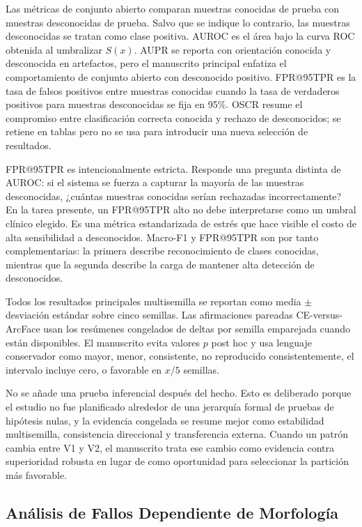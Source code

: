 \documentclass[11pt]{article}
\begin{document}
Las métricas de conjunto abierto comparan muestras conocidas de prueba con muestras desconocidas de prueba. Salvo que se indique lo contrario, las muestras desconocidas se tratan como clase positiva. AUROC es el área bajo la curva ROC obtenida al umbralizar $S(x)$. AUPR se reporta con orientación conocida y desconocida en artefactos, pero el manuscrito principal enfatiza el comportamiento de conjunto abierto con desconocido positivo. FPR@95TPR es la tasa de falsos positivos entre muestras conocidas cuando la tasa de verdaderos positivos para muestras desconocidas se fija en 95\%. OSCR resume el compromiso entre clasificación correcta conocida y rechazo de desconocidos; se retiene en tablas pero no se usa para introducir una nueva selección de resultados.

FPR@95TPR es intencionalmente estricta. Responde una pregunta distinta de AUROC: si el sistema se fuerza a capturar la mayoría de las muestras desconocidas, ¿cuántas muestras conocidas serían rechazadas incorrectamente? En la tarea presente, un FPR@95TPR alto no debe interpretarse como un umbral clínico elegido. Es una métrica estandarizada de estrés que hace visible el costo de alta sensibilidad a desconocidos. Macro-F1 y FPR@95TPR son por tanto complementarias: la primera describe reconocimiento de clases conocidas, mientras que la segunda describe la carga de mantener alta detección de desconocidos.

Todos los resultados principales multisemilla se reportan como media $\pm$ desviación estándar sobre cinco semillas. Las afirmaciones pareadas CE-versus-ArcFace usan los resúmenes congelados de deltas por semilla emparejada cuando están disponibles. El manuscrito evita valores $p$ post hoc y usa lenguaje conservador como mayor, menor, consistente, no reproducido consistentemente, el intervalo incluye cero, o favorable en $x/5$ semillas.

No se añade una prueba inferencial después del hecho. Esto es deliberado porque el estudio no fue planificado alrededor de una jerarquía formal de pruebas de hipótesis nulas, y la evidencia congelada se resume mejor como estabilidad multisemilla, consistencia direccional y transferencia externa. Cuando un patrón cambia entre V1 y V2, el manuscrito trata ese cambio como evidencia contra superioridad robusta en lugar de como oportunidad para seleccionar la partición más favorable.

\subsection{Análisis de Fallos Dependiente de Morfología}
\end{document}
